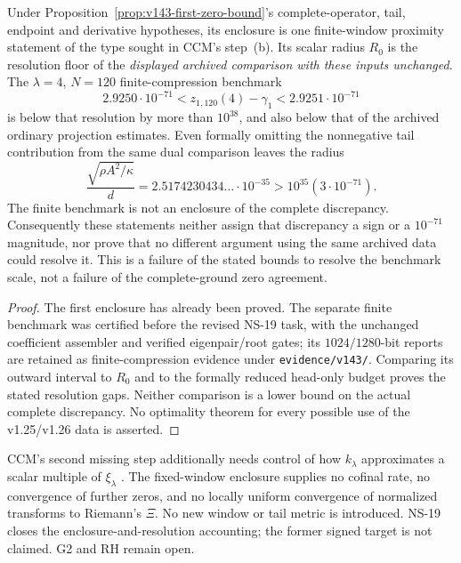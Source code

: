 \begin{proposition}
\label{prop:v143-fixed-window-meaning}
Under Proposition~\ref{prop:v143-first-zero-bound}'s complete-operator,
tail, endpoint and derivative hypotheses, its enclosure is one
finite-window proximity statement of the type sought in CCM's
step~(b). Its scalar radius $R_0$ is the resolution floor of the
\emph{displayed archived comparison with these inputs unchanged}.
The $\lambda=4$, $N=120$ finite-compression benchmark
\[
 2.9250\cdot10^{-71}<z_{1,120}(4)-\gamma_1
                         <2.9251\cdot10^{-71}
\]
is below that resolution by more than $10^{38}$, and also below
that of the archived ordinary projection estimates. Even formally
omitting the nonnegative tail contribution from the same dual
comparison leaves the radius
\[
 \frac{\sqrt{\rho A^2/\kappa}}d
 =2.5174230434\ldots\cdot10^{-35}>10^{35}(3\cdot10^{-71}).
\]
The finite benchmark is not an enclosure of the complete discrepancy.
Consequently these statements neither assign that discrepancy a sign
or a $10^{-71}$ magnitude, nor prove that no different argument using
the same archived data could resolve it. This is a failure of the
stated bounds to resolve the benchmark scale, not a failure of the
complete-ground zero agreement.
\end{proposition}
\begin{proof}
The first enclosure has already been proved. The separate finite
benchmark was certified before the revised NS-19 task, with the
unchanged coefficient assembler and verified eigenpair/root gates;
its $1024/1280$-bit reports are retained as finite-compression evidence
under \texttt{evidence/v143/}. Comparing its outward interval to
$R_0$ and to the formally reduced head-only budget proves the
stated resolution gaps. Neither comparison is a lower bound on the
actual complete discrepancy. No optimality theorem for every
possible use of the v1.25/v1.26 data is asserted.
\end{proof}

CCM's second missing step additionally needs control of how
$k_\lambda$ approximates a scalar multiple of $\xi_\lambda$
\cite[Section 8]{ConnesConsaniMoscovici2025}. The fixed-window
enclosure supplies no cofinal rate, no convergence of further zeros,
and no locally uniform convergence of normalized transforms to
Riemann's $\Xi$. No new window or tail metric is introduced.
NS-19 closes the enclosure-and-resolution accounting; the former
signed target is not claimed. G2 and RH remain open.
